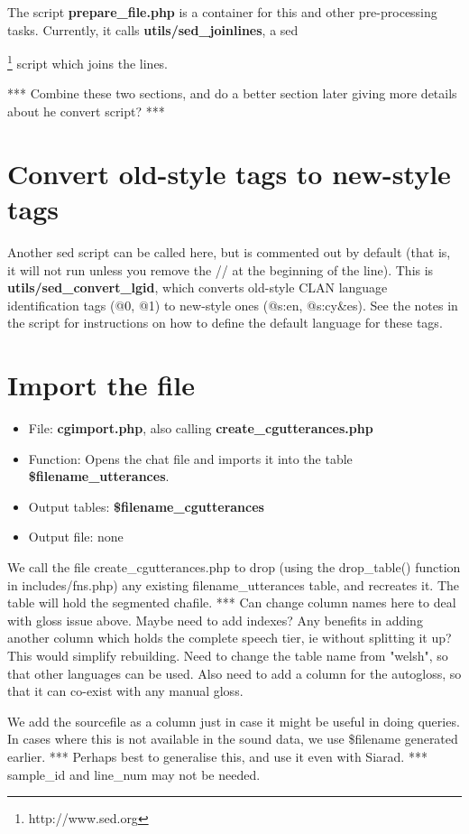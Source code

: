 \documentclass[a4paper,10pt]{article}
\begin{document}
The script \textbf{prepare\_file.php} is a container for this and other pre-processing tasks.  Currently, it calls \textbf{utils/sed\_joinlines}, a sed{\footnote{http://www.sed.org} script which joins the lines.

*** Combine these two sections, and do a better section later giving more details about he convert script? ***

\section{Convert old-style tags to new-style tags}
\label{sec:converttags}
Another sed script can be called here, but is commented out by default (that is, it will not run unless you remove the // at the beginning of the line).  This is \textbf{utils/sed\_convert\_lgid}, which converts old-style CLAN language identification
tags (@0, @1) to new-style ones (@s:en, @s:cy&es).  See the notes in the script for instructions on how to define the default language for these tags.


\section{Import the file}
\label{sec:import}

\begin{itemize}
\item File: \textbf{cgimport.php}, also calling \textbf{create\_cgutterances.php}
\item Function: Opens the chat file and imports it into the table \textbf{\$filename\_utterances}.
\item Output tables: \textbf{\$filename\_cgutterances}
\item Output file: none                 
\end{itemize}

We call the file create\_cgutterances.php to drop (using the drop\_table() function in includes/fns.php) any existing filename\_utterances table, and recreates it.  The table will hold the segmented chafile.
*** Can change column names here to deal with gloss issue above.  Maybe need to add indexes?  Any benefits in adding another column which holds the complete speech tier, ie without splitting it up?  This would simplify rebuilding.  Need to change the table name from "welsh", so that other languages can be used.  Also need to add a column for the autogloss, so that it can co-exist with any manual gloss.

We add the sourcefile as a column just in case it might be useful in doing queries.  In cases where this is not available in the sound data, we use \$filename generated earlier. *** Perhaps best to generalise this, and use it even with Siarad. *** sample\_id and line\_num may not be needed.

}
\end{document}

